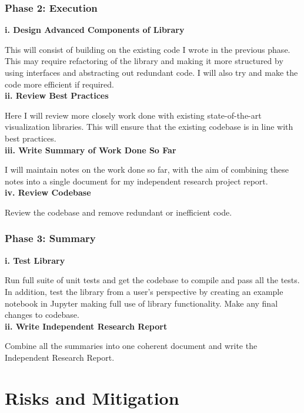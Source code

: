 \documentclass[12pt]{article}
\begin{document}
\subsubsection{Phase 2: Execution}

\textbf{i. Design Advanced Components of Library}

This will consist of building on the existing code I wrote in the previous phase. This may require refactoring of the library and making it more structured by using interfaces and abstracting out redundant code. I will also try and make the code more efficient if required. \\

\textbf{ii. Review Best Practices}

Here I will review more closely work done with existing state-of-the-art visualization libraries. This will ensure that the existing codebase is in line with best practices. \\

\textbf{iii. Write Summary of Work Done So Far}

I will maintain notes on the work done so far, with the aim of combining these notes into a single document for my independent research project report. \\

\textbf{iv. Review Codebase}

Review the codebase and remove redundant or inefficient code. 

\subsubsection{Phase 3: Summary}

\textbf{i. Test Library}

Run full suite of unit tests and get the codebase to compile and pass all the tests. In addition, test the library from a user's perspective by creating an example notebook in Jupyter making full use of library functionality. Make any final changes to codebase. \\

\textbf{ii. Write Independent Research Report}

Combine all the summaries into one coherent document and write the Independent Research Report. \\

\section{Risks and Mitigation}
\end{document}
